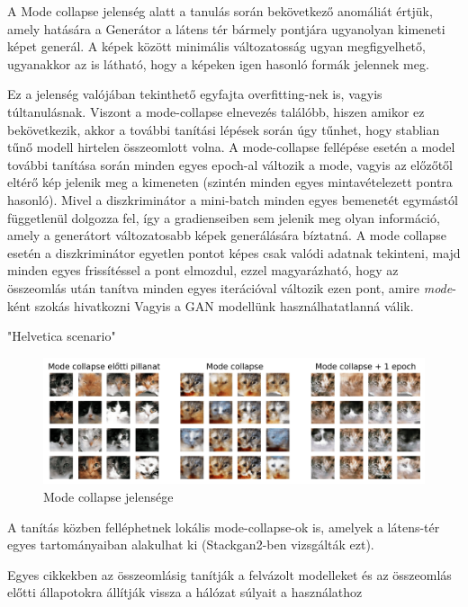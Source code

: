 
A Mode collapse jelenség alatt a tanulás során bekövetkező anomáliát értjük, amely hatására a Generátor a látens tér bármely pontjára ugyanolyan kimeneti képet generál. A képek között minimális változatosság ugyan megfigyelhető, ugyanakkor az is látható, hogy a képeken igen hasonló formák jelennek meg.

Ez a jelenség valójában tekinthető egyfajta overfitting-nek is, vagyis túltanulásnak. Viszont a mode-collapse elnevezés találóbb, hiszen amikor ez bekövetkezik, akkor a további tanítási lépések során úgy tűnhet, hogy stablian tűnő modell hirtelen összeomlott volna.
A mode-collapse fellépése esetén a model további tanítása során minden egyes epoch-al változik a mode, vagyis az előzőtől eltérő kép jelenik meg a kimeneten (szintén minden egyes mintavételezett pontra hasonló). Mivel a diszkriminátor a mini-batch minden egyes bemenetét egymástól függetlenül dolgozza fel, így a gradienseiben sem jelenik meg olyan információ, amely a generátort változatosabb képek generálására bíztatná. A mode collapse esetén a diszkriminátor egyetlen pontot képes csak valódi adatnak tekinteni, majd minden egyes frissítéssel a pont elmozdul, ezzel magyarázható, hogy az összeomlás után tanítva minden egyes iterációval változik ezen pont, amire \textit{mode}-ként szokás hivatkozni \cite{salimans2016improved} Vagyis a GAN modellünk használhatatlanná válik.

"Helvetica scenario"

\begin{figure}[h]
\centering
\includegraphics[width=15cm]{images/mode-collapse.png}
\caption{Mode collapse jelensége}
\label{fig:mode-collapse}
\end{figure}

A tanítás közben felléphetnek lokális mode-collapse-ok is, amelyek a látens-tér egyes tartományaiban alakulhat ki (Stackgan2-ben vizsgálták ezt).

Egyes cikkekben az összeomlásig tanítják a felvázolt modelleket és az összeomlás előtti állapotokra állítják vissza a hálózat súlyait a használathoz \cite{brock2018large}


